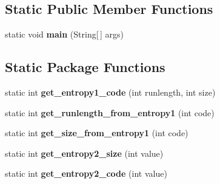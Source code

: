 \subsection*{Static Public Member Functions}
\begin{DoxyCompactItemize}
\item 
\mbox{\label{classdomini_1_1algorithm_1_1JPEG_a049a54398fe4b90620d0ac1ea1fdf780}} 
static void {\bfseries main} (String\mbox{[}$\,$\mbox{]} args)
\end{DoxyCompactItemize}
\subsection*{Static Package Functions}
\begin{DoxyCompactItemize}
\item 
\mbox{\label{classdomini_1_1algorithm_1_1JPEG_a7c22a7a65763bf92181473df447f72c8}} 
static int {\bfseries get\+\_\+entropy1\+\_\+code} (int runlength, int size)
\item 
\mbox{\label{classdomini_1_1algorithm_1_1JPEG_a9a60945af9ce8de6086bd5dfa386f175}} 
static int {\bfseries get\+\_\+runlength\+\_\+from\+\_\+entropy1} (int code)
\item 
\mbox{\label{classdomini_1_1algorithm_1_1JPEG_a8d1005fb7833d36a064afb1c5e15bbd3}} 
static int {\bfseries get\+\_\+size\+\_\+from\+\_\+entropy1} (int code)
\item 
\mbox{\label{classdomini_1_1algorithm_1_1JPEG_affccb19b13041ba0549beb9a5986c0f1}} 
static int {\bfseries get\+\_\+entropy2\+\_\+size} (int value)
\item 
\mbox{\label{classdomini_1_1algorithm_1_1JPEG_ac2a5593f3f9baa1ce4065d2f89194611}} 
static int {\bfseries get\+\_\+entropy2\+\_\+code} (int value)
\end{DoxyCompactItemize}
